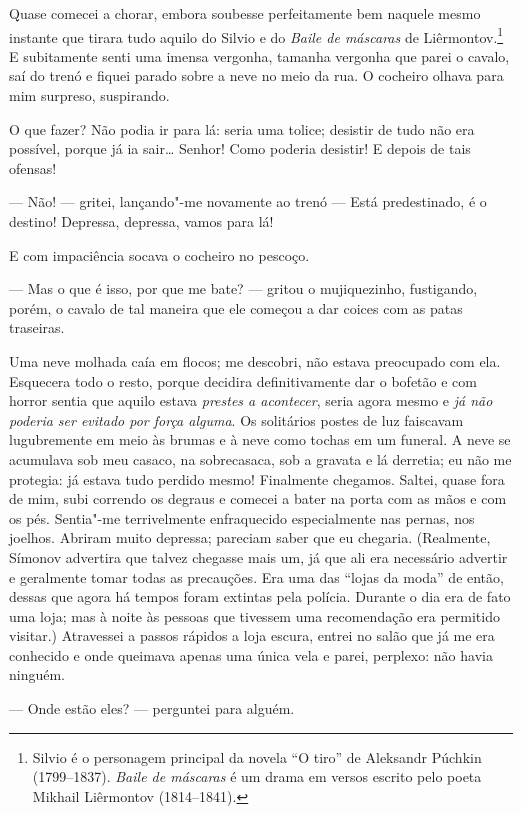 Quase comecei a chorar, embora soubesse perfeitamente bem naquele mesmo
instante que tirara tudo aquilo do Silvio e do \textit{Baile de máscaras} de
Liêrmontov.\footnote{ Silvio é o personagem principal da novela “O tiro” de
Aleksandr Púchkin (1799--1837). \textit{Baile de máscaras} é um drama em versos
escrito pelo poeta Mikhail Liêrmontov (1814--1841).} E subitamente senti uma
imensa vergonha, tamanha vergonha que parei o cavalo, saí do trenó e fiquei
parado sobre a neve no meio da rua. O cocheiro olhava para mim surpreso,
suspirando.

O que fazer? Não podia ir para lá: seria uma tolice; desistir de tudo não era
possível, porque já ia sair\ldots{} Senhor! Como poderia desistir! E depois de
tais ofensas!

--- Não! --- gritei, lançando"-me novamente ao trenó --- Está predestinado, é o
destino! Depressa, depressa, vamos para lá!

E com impaciência socava o cocheiro no pescoço.

--- Mas o que é isso, por que me bate? --- gritou o mujiquezinho, fustigando,
porém, o cavalo de tal maneira que ele começou a dar coices com as patas
traseiras.

Uma neve molhada caía em flocos; me descobri, não estava preocupado com ela.
Esquecera todo o resto, porque decidira definitivamente dar o bofetão e com
horror sentia que aquilo estava \textit{prestes a acontecer}, seria agora mesmo
e \textit{já não poderia ser evitado por força alguma}. Os solitários postes de
luz faiscavam lugubremente em meio às brumas e à neve como tochas em um
funeral. A neve se acumulava sob meu casaco, na sobrecasaca, sob a gravata e lá
derretia; eu não me protegia: já estava tudo perdido mesmo! Finalmente
chegamos. Saltei, quase fora de mim, subi correndo os degraus e comecei a bater
na porta com as mãos e com os pés. Sentia"-me terrivelmente enfraquecido
especialmente nas pernas, nos joelhos.  Abriram muito depressa; pareciam saber
que eu chegaria. (Realmente, Símonov advertira que talvez chegasse mais um, já
que ali era necessário advertir e geralmente tomar todas as precauções. Era uma
das “lojas da moda” de então, dessas que agora há tempos foram extintas pela
polícia. Durante o dia era de fato uma loja; mas à noite às pessoas que
tivessem uma recomendação era permitido visitar.) Atravessei a passos rápidos a
loja escura, entrei no salão que já me era conhecido e onde queimava apenas uma
única vela e parei, perplexo: não havia ninguém.

--- Onde estão eles? --- perguntei para alguém.

